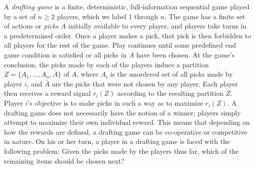 \documentclass[letterpaper]{article}
\numberwithin{equation}{section}
\numberwithin{theorem}{section}
\numberwithin{lemma}{section}
\numberwithin{df}{section}
\begin{document}
A \emph{drafting game} is a finite, deterministic, full-information sequential game played by a set of $n \geq 2$ players, which we label 1 through $n$.  The game has a finite set of actions or \emph{picks} $A$ initially available to every player, and players take turns in a predetermined order.  Once a player makes a pick, that pick is then forbidden to all players for the rest of the game.  Play continues until some predefined end game condition is satisfied or all picks in $A$ have been chosen.  At the game's conclusion, the picks made by each of the players induce a partition $Z = \{A_1, ..., A_{n}, \bar{A}\}$ of $A$, where $A_i$ is the unordered set of all picks made by player $i$, and $\bar{A}$ are the picks that were not chosen by any player.  Each player then receives a reward signal $r_i(Z)$ according to the resulting partition $Z$.  Player $i$'s objective is to make picks in such a way as to maximize $r_i(Z)$.  A drafting game does not necessarily have the notion of a winner; players simply attempt to maximize their own individual reward.  This means that depending on how the rewards are defined, a drafting game can be co-operative or competitive in nature.  On his or her turn, a player in a drafting game is faced with the following problem: Given the picks made by the players thus far, which of the remaining items should be chosen next? %

%
\end{document}
